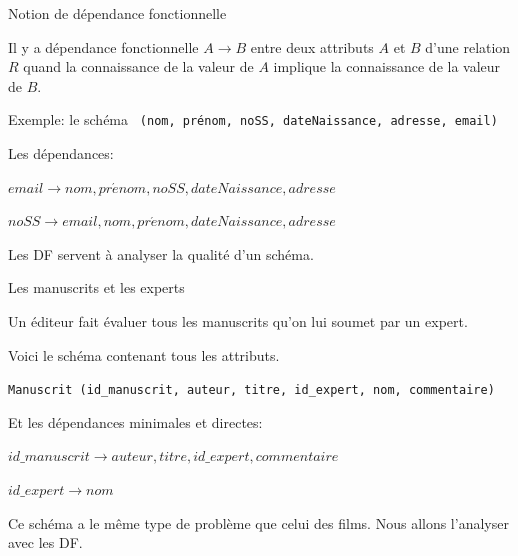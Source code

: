 \begin{frame}{Notion de dépendance fonctionnelle}

Il y a \alert{dépendance fonctionnelle} $A \to B$ entre deux attributs $A$ et $B$ d'une relation
$R$ quand la connaissance de la valeur de $A$ implique la connaissance de la valeur de $B$.

\vfill

Exemple: le schéma \texttt{ (nom, prénom, noSS, dateNaissance, adresse, email)}

\vfill
Les dépendances:
\begin{redbullet}
  \item $email \to nom, pr\acute{e}nom, noSS, dateNaissance, adresse$
 \item $noSS \to  email, nom, pr\acute{e}nom, dateNaissance, adresse$
\end{redbullet}

\vfill

\begin{blocgauche}
Les DF servent à analyser la qualité d'un schéma.
\end{blocgauche}

\end{frame}

\begin{frame}{Les manuscrits et les experts}

Un éditeur fait évaluer tous les manuscrits qu'on lui soumet par un expert. 

\vfill 
Voici le schéma contenant tous les attributs.

\vfill

\texttt{Manuscrit (id\_manuscrit, auteur, titre, id\_expert, nom, commentaire)}

\vfill

Et les dépendances \alert{minimales} et \alert{directes}:

\vfill
\begin{redbullet}
  \item $id\_manuscrit \to auteur, titre, id\_expert, commentaire$
 \item $id\_expert \to  nom$
\end{redbullet}

\vfill

\begin{blocgauche}
Ce schéma a le même type de problème que celui des films. Nous allons l'analyser avec les DF.
\end{blocgauche}

\end{frame}


